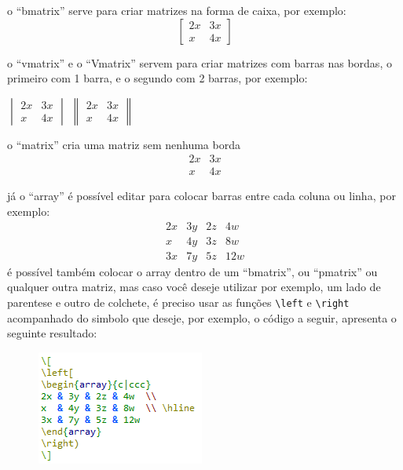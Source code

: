 o ``bmatrix'' serve para criar matrizes na forma de caixa, por exemplo:
\[
\begin{bmatrix}
2x & 3x \\ 
x & 4x
\end{bmatrix} 
\]

o ``vmatrix'' e o ``Vmatrix'' servem para criar matrizes com barras nas bordas, o primeiro com 1 barra, e o segundo com 2 barras, por exemplo: \\
\begin{center}
$
\begin{vmatrix}
2x & 3x \\ 
x & 4x
\end{vmatrix} 
$
\hspace*{2cm}
$
\begin{Vmatrix}
2x & 3x \\ 
x & 4x
\end{Vmatrix} 
$
\end{center}

o ``matrix'' cria uma matriz sem nenhuma borda
\[
\begin{matrix}
2x & 3x \\ 
x & 4x
\end{matrix}
\]

já o ``array'' é possível editar para colocar barras entre cada coluna ou linha, por exemplo:
\[
\begin{array}{c|ccc}
2x & 3y &2z & 4w\\ 
x & 4y & 3z & 8w \\ \hline
3x & 7y & 5z & 12w
\end{array}
\]
é possível também colocar o array dentro de um ``bmatrix'', ou ``pmatrix'' ou qualquer outra matriz, mas caso você deseje utilizar por exemplo, um lado de parentese e outro de colchete, é preciso usar as funções \lstinline|\left| e \lstinline|\right| acompanhado do simbolo que deseje, por exemplo, o código a seguir, apresenta o seguinte resultado:

\begin{figure}[htb]
	\begin{center}
		\includegraphics[scale=1]{./Imagens/capitulo_2/code_3.png}
	\end{center}
\end{figure}

